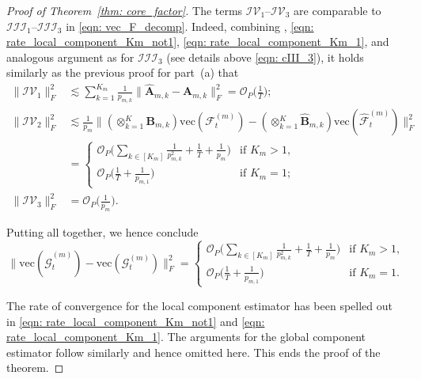\documentclass[aos]{imsart}
\theoremstyle{plain}
\theoremstyle{definition}
\def\wh#1{\widehat{#1}}
\def\cF{\mathcal{F}}
\def\cG{\mathcal{G}} \def\cH{\boldsymbol{\mathcal{H}}} \def\cI{\mathcal{I}}
\def\cIII{\mathcal{III}}
\def\cIV{\mathcal{IV}}
\def\cO{\mathcal{O}}
\def\bA{\mathbf{A}}
\def\bB{\mathbf{B}}
\def\vec{\mathrm{vec}}
\begin{document}
\begin{proof}[Proof of Theorem~\ref{thm: core_factor}]
The terms $\cIV_1$--$\cIV_3$ are comparable to $\cIII_1$--$\cIII_3$ in \eqref{eqn: vec_F_decomp}. Indeed, combining , \eqref{eqn: rate_local_component_Km_not1}, \eqref{eqn: rate_local_component_Km_1}, and analogous argument as for $\cIII_3$ (see details above \eqref{eqn: cIII_3}), it holds similarly as the previous proof for part~(a) that
\begin{align*}
    \|\cIV_1\|_F^2 &\lesssim \sum_{k=1}^{K_m} \frac{1}{p_{m,k}} \Big\| \wh{\bA}_{m,k} -\bA_{m,k} \Big\|_F^2 = \cO_P\Big( \frac{1}{T} \Big) ; \\
    \|\cIV_2\|_F^2 &\lesssim \frac{1}{p_m} \Big\| (\otimes_{k=1}^K \bB_{m,k}) \vec(\cF_t^{(m)}) - (\otimes_{k=1}^K \wh{\bB}_{m,k}) \vec(\wh\cF_t^{(m)}) \Big\|_F^2 \\
    &= \begin{cases}
        \cO_P\Big( \sum_{k\in[K_m]} \frac{1}{p_{m,k}^2} + \frac{1}{T} + \frac{1}{p_m} \Big) & \text{if $K_m> 1$,} \\
        \cO_P\Big( \frac{1}{T} + \frac{1}{p_{m,1}} \Big) & \text{if $K_m= 1$;}
    \end{cases} \\
    \|\cIV_3\|_F^2 &= \cO_P\Big( \frac{1}{p_m} \Big) .
\end{align*}

Putting all together, we hence conclude
\[
\Big\| \vec(\wh{\cG}_t^{(m)}) - \vec(\cG_t^{(m)}) \Big\|_F^2 =
\begin{cases}
    \cO_P\Big( \sum_{k\in[K_m]} \frac{1}{p_{m,k}^2} + \frac{1}{T} + \frac{1}{p_m} \Big) & \text{if $K_m> 1$,} \\
    \cO_P\Big( \frac{1}{T} + \frac{1}{p_{m,1}} \Big) & \text{if $K_m= 1$.}
\end{cases}
\]

The rate of convergence for the local component estimator has been spelled out in \eqref{eqn: rate_local_component_Km_not1} and \eqref{eqn: rate_local_component_Km_1}. The arguments for the global component estimator follow similarly and hence omitted here. This ends the proof of the theorem.
\end{proof}
\end{document}
